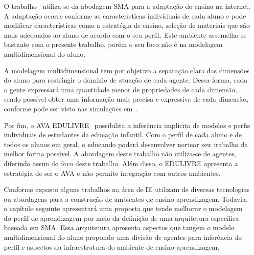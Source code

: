 O trabalho~\cite{geyer2001semeai} utiliza-se da abodagem SMA para a adaptação do ensino na internet. A adaptação ocorre conforme as características individuais de cada aluno e pode modificar características como a estratégia de ensino, seleção de materiais que são mais adequados ao aluno de acordo com o seu perfil. Este ambiente assemelha-se bastante com o presente trabalho, porém o seu foco não é na modelagem multidimensional do aluno.

A modelagem multidimensional tem por objetivo a separação clara das dimensões do aluno para restringir o domínio de atuação de cada agente. Dessa forma, cada a gente expressará uma quantidade menor de propriedades de cada dimensão, sendo possível obter uma informação mais precisa e expressiva de cada dimensão, conforme pode ser visto nas simulações em~\cite{helbing11}.

Por fim, o AVA EDULIVRE~\cite{rabelo2010identificacao} possibilita a inferência implícita de modelos e perfis individuais de estudantes da educação infantil. Com o perfil de cada aluno e de todos os alunos em geral, o educando poderá desenvolver nortear seu trabalho da melhor forma possível. A abordagem deste trabalho não utiliza-se de agentes, diferindo assim do foco deste trabalho. Além disso, o EDULIVRE apresenta a estratégia de ser o AVA e não permite integração com outros ambientes.

Conforme exposto alguns trabalhos na área de IE utilizam de diversas tecnologias ou abordagens para a construção de ambientes de ensino-aprendizagem. Todavia, o capítulo seguinte apresentará uma proposta que tende melhorar o modelagem do perfil de aprendizagem por meio da definição de uma arquitetura específica baseada em SMA. Essa arquitetura apresenta aspectos que tangem o modelo multidimensional do aluno propondo uma divisão de agentes para inferência do perfil e aspectos da infraestrutura do ambiente de ensino-aprendizagem.













